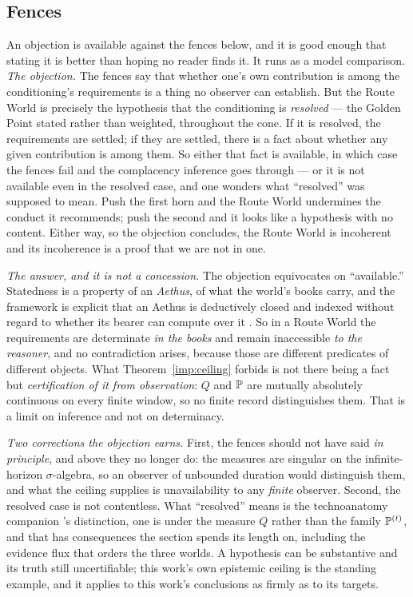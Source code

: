 \subsection{Fences}\label{gc:sub:routefences}

\begin{remark}\label{gc:rem:determinacygap}
An objection is available against the fences below, and it is good enough
that stating it is better than hoping no reader finds it. It runs as a
model comparison. \emph{The objection.} The fences say that whether one's own contribution
is among the conditioning's requirements is a thing no observer can
establish. But the Route World is precisely the hypothesis that the
conditioning is \emph{resolved} --- the Golden Point stated rather than
weighted, throughout the cone. If it is resolved, the requirements are
settled; if they are settled, there is a fact about whether any given
contribution is among them. So either that fact is available, in which
case the fences fail and the complacency inference goes through --- or it
is not available even in the resolved case, and one wonders what
``resolved'' was supposed to mean. Push the first horn and the Route
World undermines the conduct it recommends; push the second and it looks
like a hypothesis with no content. Either way, so the objection
concludes, the Route World is incoherent and its incoherence is a proof
that we are not in one.

\emph{The answer, and it is not a concession.} The objection equivocates
on ``available.'' Statedness is a property of an \emph{Aethus}, of
what the world's books carry, and the framework is explicit that an
Aethus is deductively closed and indexed without regard to whether its
bearer can compute over it \cite{Aethus}. So in a Route World the
requirements are determinate \emph{in the books} and remain inaccessible
\emph{to the reasoner}, and no contradiction arises, because those are
different predicates of different objects. What
Theorem~\ref{imp:ceiling} forbids is not there being a fact but
\emph{certification of it from observation}: $Q$ and $\mathbb{P}$ are mutually
absolutely continuous on every finite window, so no finite record
distinguishes them. That is a limit on inference and not on determinacy.

\emph{Two corrections the objection earns.} First, the fences should not
have said \emph{in principle}, and above they no longer do: the measures
are singular on the infinite-horizon $\sigma$-algebra, so an observer of
unbounded duration would distinguish them, and what the ceiling supplies
is unavailability to any \emph{finite} observer. Second, the resolved
case is not contentless. What ``resolved'' means is
the technoanatomy companion \cite{GoldenTechnoanatomy}'s distinction, one is under the
measure $Q$ rather than the family $\mathbb{P}^{(t)}$, and that has
consequences the section spends its length on, including the evidence
flux that orders the three worlds. A hypothesis can be substantive and
its truth still uncertifiable; this work's own epistemic ceiling is the
standing example, and it applies to this work's conclusions as firmly as
to its targets.


\end{remark}
